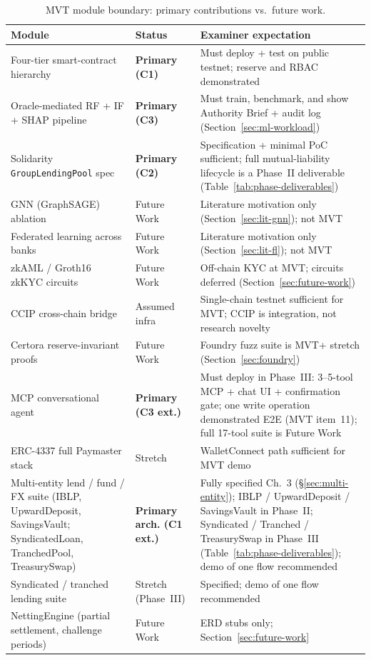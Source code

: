 \documentclass[12pt,a4paper]{report}
\newcommand{\tableheadcolor}{\rowcolor{TableHeadBg}}
\begin{document}
\begin{table}[H]
\centering
\caption[MVT module boundary: primary contributions vs.\ future work]{MVT module boundary: primary contributions vs.\ future work.}
\label{tab:contributions-vs-future}
\begin{tabular}{p{4.2cm}p{2.2cm}p{7.8cm}}
\toprule
\tableheadcolor
\textbf{Module} & \textbf{Status} & \textbf{Examiner expectation} \\
\midrule
Four-tier smart-contract hierarchy & \textbf{Primary (C1)} & Must deploy + test on public testnet; reserve and RBAC demonstrated \\
Oracle-mediated RF + IF + SHAP pipeline & \textbf{Primary (C3)} & Must train, benchmark, and show Authority Brief + audit log (Section~\ref{sec:ml-workload}) \\
Solidarity \texttt{GroupLendingPool} spec & \textbf{Primary (C2)} & Specification + minimal PoC sufficient; full mutual-liability lifecycle is a Phase~II deliverable (Table~\ref{tab:phase-deliverables}) \\
GNN (GraphSAGE) ablation & Future Work & Literature motivation only (Section~\ref{sec:lit-gnn}); not MVT \\
Federated learning across banks & Future Work & Literature motivation only (Section~\ref{sec:lit-fl}); not MVT \\
zkAML / Groth16 zkKYC circuits & Future Work & Off-chain KYC at MVT; circuits deferred (Section~\ref{sec:future-work}) \\
CCIP cross-chain bridge & Assumed infra & Single-chain testnet sufficient for MVT; CCIP is integration, not research novelty \\
Certora reserve-invariant proofs & Future Work & Foundry fuzz suite is MVT+ stretch (Section~\ref{sec:foundry}) \\
MCP conversational agent & \textbf{Primary (C3 ext.)} & Must deploy in Phase~III: 3--5-tool MCP + chat UI + confirmation gate; one write operation demonstrated E2E (MVT item~11); full 17-tool suite is Future Work \\
ERC-4337 full Paymaster stack & Stretch & WalletConnect path sufficient for MVT demo \\
Multi-entity lend / fund / FX suite (IBLP, UpwardDeposit, SavingsVault; SyndicatedLoan, TranchedPool, TreasurySwap) & \textbf{Primary arch. (C1 ext.)} & Fully specified Ch.~3 (\S\ref{sec:multi-entity}); IBLP / UpwardDeposit / SavingsVault in Phase~II; Syndicated / Tranched / TreasurySwap in Phase~III (Table~\ref{tab:phase-deliverables}); demo of one flow recommended \\
Syndicated / tranched lending suite & Stretch (Phase~III) & Specified; demo of one flow recommended \\
NettingEngine (partial settlement, challenge periods) & Future Work & ERD stubs only; Section~\ref{sec:future-work} \\
\bottomrule
\end{tabular}
\end{table}
\end{document}

